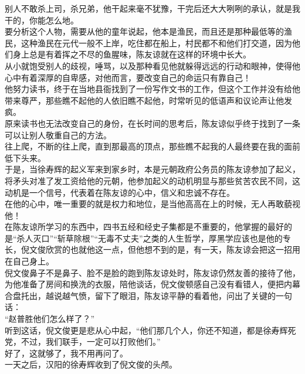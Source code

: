 \begin{multicols}{\theparacolNo}
别人不敢杀上司，杀兄弟，他干起来毫不犹豫，干完后还大大咧咧的承认，就是我干的，你能怎么地。\\

要分析这个人物，需要从他的童年说起，他本是渔民，而且还是那种最低等的渔民，这种渔民在元代一般不上岸，吃住都在船上，村民都不和他们打交道，因为他们身上总是有着挥之不尽的鱼腥味，陈友谅就在这样的环境中长大。\\

从小就饱受别人的歧视，唾骂，以及那种看见他就躲得远远的行动和眼神，使得他心中有着深厚的自卑感，对他而言，要改变自己的命运只有靠自己！\\

他努力读书，终于在当地县衙找到了一份写作文书的工作，但这个工作并没有给他带来尊严，那些瞧不起他的人依旧瞧不起他，时常听见的低语声和议论声让他发疯。\\

原来读书也无法改变自己的身份，在长时间的思考后，陈友谅似乎终于找到了一条可以让别人敬重自己的方法。\\

往上爬，不断的往上爬，直到那最高的顶点，那些瞧不起我的人最终要在我的面前低下头来。\\

于是，当徐寿辉的起义军来到家乡时，本是元朝政府公务员的陈友谅参加了起义，将矛头对准了发工资给他的元朝，他参加起义的动机明显与那些贫苦农民不同，这动机是一个信号，代表着在陈友谅的心中，信义和忠诚不存在。\\

在他的心中，唯一重要的就是权力和地位，是当他高高在上的时候，无人再敢藐视他！\\

在陈友谅所学习的东西中，四书五经和经史子集都是不重要的，他掌握的最好的是“杀人灭口”“斩草除根”“无毒不丈夫”之类的人生哲学，厚黑学应该也是他的专长，倪文俊欣赏的也就他这一点，但他想不到的是，有一天，陈友谅会把这一招用在自己身上。\\

倪文俊鼻子不是鼻子、脸不是脸的跑到陈友谅处时，陈友谅仍然友善的接待了他，为他准备了房间和换洗的衣服，陪他谈话，倪文俊顿感自己没有看错人，便把内幕合盘托出，越说越气愤，留下了眼泪，陈友谅平静的看着他，问出了关键的一句话：\\

“赵普胜他们怎么样了？”\\

听到这话，倪文俊更是悲从心中起，“他们那几个人，你还不知道，都是徐寿辉死党，不过，我们联手，一定可以打败他们。”\\

好了，这就够了，我不用再问了。\\

一天之后，汉阳的徐寿辉收到了倪文俊的头颅。\\
\ifnum{}
	\end{multicols}
\fi
\newpage
